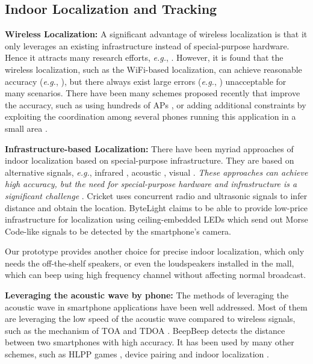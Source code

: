 \documentclass[]{sig-alternate-10pt}
\def\eg{\textit{e.g.}\xspace}
\begin{document}
\subsection{Indoor Localization and Tracking}
\noindent\textbf{Wireless Localization:} 
A significant advantage of wireless
localization is that it only leverages an existing infrastructure
instead of special-purpose hardware. Hence it attracts many research
efforts, \eg, \cite{Youssef:2005:HWL:1067170.1067193
,DBLP:conf/infocom/BahlP00,2010-MOBICOM-Didyousee,2012-MOBICOM-Locatinginfingerprint,2012-MOBICOM-PushlimitWiFi,2012-MOBICOM-Zeezeroeffort}.
However, it is found \cite{2012-MOBICOM-PushlimitWiFi} that the
wireless localization, such as the WiFi-based localization, can
achieve reasonable accuracy (\eg, ), but there always exist
large errors (\eg, ) unacceptable for many scenarios.  There
have  been many schemes proposed recently that improve the accuracy, such as using hundreds of APs \cite{5168931}, or adding
additional constraints by  
  exploiting the coordination among several phones 
 running this application in a small area \cite{2012-MOBICOM-PushlimitWiFi}.

\noindent\textbf{Infrastructure-based Localization:} 
There have been myriad approaches of indoor localization based on
special-purpose 
infrastructure. They are based on alternative signals, \eg,  
infrared \cite{Want:1992:ABL:128756.128759}, acoustic
\cite{626982}, visual
\cite{DBLP:journals/trob/SeLL05}. \textit{These approaches can
achieve high accuracy, but the need for special-purpose hardware and
infrastructure is a significant challenge} \cite{2012-MOBICOM-Zeezeroeffort}.
Cricket \cite{Priyantha:2000:CLS:345910.345917} uses concurrent radio
and ultrasonic signals to infer distance and obtain the location. 
ByteLight \cite{byteLight} claims to be able to provide low-price
infrastructure for localization using 
ceiling-embedded LEDs which send out Morse Code-like  signals
to be detected by the smartphone's camera. 

Our prototype provides another choice for precise indoor localization,
which only needs the off-the-shelf speakers,  or
even the loudspeakers installed in the mall, which can beep using high
frequency channel  without affecting normal broadcast. 

\noindent\textbf{Leveraging the acoustic wave by phone:} 
The methods of leveraging the acoustic wave in smartphone
applications have been well addressed. Most of them are leveraging the
low speed of the acoustic wave compared to wireless signals, such as
the mechanism of TOA \cite{2007-SenSys-BeepBeephighaccuracy} and TDOA \cite{DBLP:conf/mobicom/YangSCVLCCGM11}. BeepBeep
\cite{2007-SenSys-BeepBeephighaccuracy} detects the distance
 between two smartphones with  high accuracy. 
It has been used by many other schemes, such
 as HLPP games
\cite{2011-SenSys-feasibilityrealtime,2012-MobiSys-SwordFightenablingnew},
device pairing \cite{2009-MobiSys-Point&Connectintentionbased} and indoor localization
\cite{2012-MOBICOM-PushlimitWiFi,2012-MOBICOM-Centaurlocatingdevices}.
\end{document}

